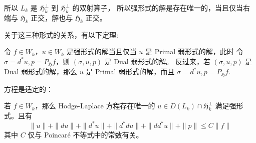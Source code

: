\documentclass[lang=cn,a4paper,newtx]{elegantpaper}
\begin{document}
所以 $L_k$ 是 $\mathfrak{H}_k^{\perp}$ 到 $\mathfrak{H}_k^{\perp}$ 的双射算子，
所以强形式的解是存在唯一的，当且仅当右端与 $\mathfrak{H}_k$ 正交，解也与 $\mathfrak{H}_k$
正交。

关于这三种形式的关系，有以下定理:
\begin{theorem}
令 $f \in W_k$，$u \in W_k$ 是强形式的解当且仅当 $u$ 是 Primal 弱形式的解，此时
令 $\sigma = d^* u, p = P_{\mathfrak{H}} f$，则 $(\sigma, u, p)$ 是 Dual 弱形式的解。
反过来，若 $(\sigma, u, p)$ 是 Dual 弱形式的解，那么 $u$ 是 Primal
弱形式的解，而且 $\sigma = d^* u, p = P_{\mathfrak{H}} f$.
\end{theorem}

方程是适定的：
\begin{theorem}
    若 $f \in W_k$，那么 Hodge-Laplace 方程存在唯一的 $u \in D(L_k)\cap
    \mathfrak{H}_k^{\perp}$ 满足强形式。且有
    $$
    \|u\| + \|du\| + \|d^* u\| + \|d^* du\| + \|d d^* u\| + \| p\| \leq C\|f\|
    $$
    其中 $C$ 仅与 Poincar\'e 不等式中的常数有关。
\end{theorem}
\end{document}
